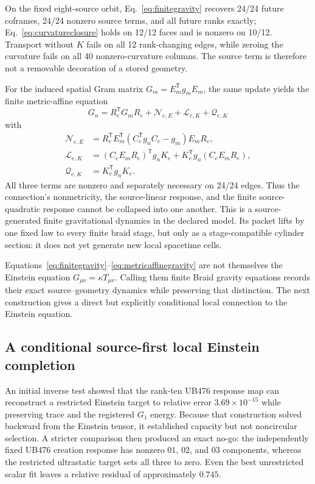 \documentclass[11pt]{article}
\theoremstyle{definition}
\theoremstyle{remark}
\begin{document}
On the fixed eight-source orbit, Eq.~\eqref{eq:finitegravity} recovers 24/24 future coframes, 24/24 nonzero source terms, and all future ranks exactly; Eq.~\eqref{eq:curvatureclosure} holds on 12/12 faces and is nonzero on 10/12. Transport without $K$ fails on all 12 rank-changing edges, while zeroing the curvature fails on all 40 nonzero-curvature columns. The source term is therefore not a removable decoration of a stored geometry.

For the induced spatial Gram matrix $G_m=E_m^{\mathsf T}g_mE_m$, the same update yields the finite metric-affine equation
\begin{equation}\label{eq:metricaffinegravity}
 \boxed{
 G_n=R_e^{\mathsf T}G_mR_e
 +\mathcal N_{e,E}+\mathcal L_{e,K}+\mathcal Q_{e,K}}
\end{equation}
with
\begin{align}
 \mathcal N_{e,E}
 &=R_e^{\mathsf T}E_m^{\mathsf T}
   (C_e^{\mathsf T}g_nC_e-g_m)E_mR_e,\\
 \mathcal L_{e,K}
 &=(C_eE_mR_e)^{\mathsf T}g_nK_e
   +K_e^{\mathsf T}g_n(C_eE_mR_e),\\
 \mathcal Q_{e,K}&=K_e^{\mathsf T}g_nK_e.
\end{align}
All three terms are nonzero and separately necessary on 24/24 edges. Thus the connection's nonmetricity, the source-linear response, and the finite source-quadratic response cannot be collapsed into one another. This is a source-generated finite gravitational dynamics in the declared model. Its packet lifts by one fixed law to every finite braid stage, but only as a stage-compatible cylinder section: it does not yet generate new local spacetime cells.

Equations~\eqref{eq:finitegravity}--\eqref{eq:metricaffinegravity} are not themselves the Einstein equation $G_{\mu\nu}=\kappa T_{\mu\nu}$. Calling them finite Braid gravity equations records their exact source--geometry dynamics while preserving that distinction. The next construction gives a direct but explicitly conditional local connection to the Einstein equation.

\subsection{A conditional source-first local Einstein completion}

An initial inverse test showed that the rank-ten UB476 response map can reconstruct a restricted Einstein target to relative error $3.69\times10^{-15}$ while preserving trace and the registered $G_1$ energy. Because that construction solved backward from the Einstein tensor, it established capacity but not noncircular selection. A stricter comparison then produced an exact no-go: the independently fixed UB476 creation response has nonzero $01$, $02$, and $03$ components, whereas the restricted ultrastatic target sets all three to zero. Even the best unrestricted scalar fit leaves a relative residual of approximately $0.745$.
\end{document}
